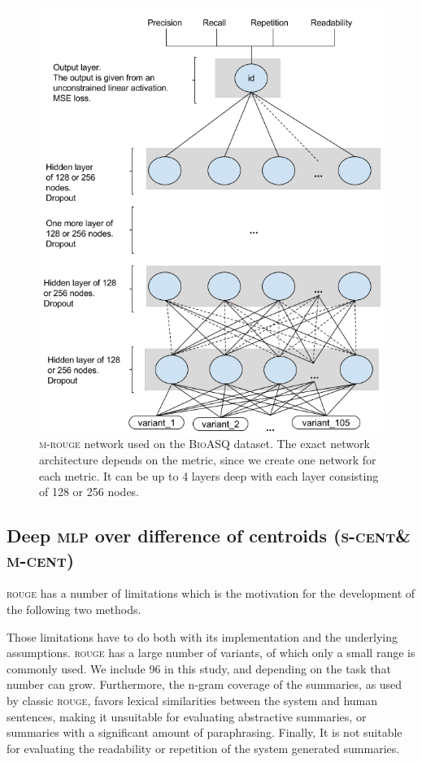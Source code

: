 \documentclass[11pt,a4paper]{article}
\newcommand{\rouge}{\textsc{rouge}\xspace}
\newcommand{\mlp}{\textsc{mlp}\xspace}
\newcommand{\bioasq}{\textsc{BioASQ}\xspace}
\newcommand{\scent}{\textsc{s-cent}\xspace}
\newcommand{\mcent}{\textsc{m-cent}\xspace}
\begin{document}
\begin{figure}[ht]
{
\centering
\includegraphics[scale=0.35]{../../my_diagrams/BioASQ_networks/BioASQ-m_rouge.png}
\caption{\textsc{m-rouge} network used on the \bioasq dataset. The exact network architecture depends on the metric, since we create one network for each metric. It can be up to 4 layers deep with each layer consisting of 128 or 256 nodes.}
\label{fig:bioasq-m-rouge}
}
\end{figure}

\subsection{Deep \mlp over difference of centroids (\scent \& \mcent)}
\label{ssec:centroids}

\rouge has a number of limitations which is the motivation for the development 
of the following two methods.

Those limitations have to do both with its implementation and the underlying 
assumptions. \rouge has a large number of variants, of which only a small range 
is commonly used. We include 96 in this study, and depending on the task that 
number can grow. Furthermore, the n-gram coverage of the summaries, as used by 
classic \rouge, favors lexical similarities between the system and human sentences, 
making it unsuitable for evaluating abstractive summaries, or summaries with a 
significant amount of paraphrasing. Finally, It is not suitable for evaluating the 
readability or repetition of the system generated summaries.
\end{document}
